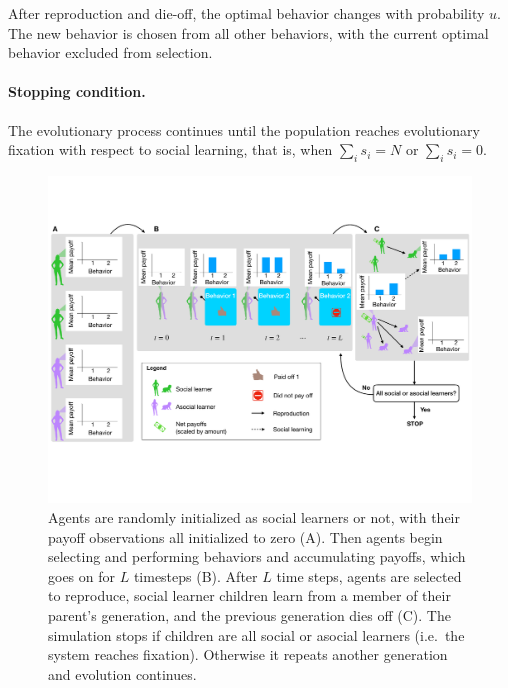 \documentclass[letterpaper,11.5pt]{scrartcl}
\newcommand{\cm}[1]{{\textcolor{mypurple} {({\tiny CM:} #1)}}}
\begin{document}
After reproduction and die-off, the optimal behavior changes with probability
$u$. The new behavior is chosen from all other behaviors, with the 
current optimal behavior excluded from selection.

\paragraph{Stopping condition.} The evolutionary process continues until the
population reaches evolutionary fixation with respect to social learning, that is, when
$\sum_i s_i = N$ or $\sum_i s_i = 0$. 

\clearpage

\begin{figure}
  \caption{Agents are randomly initialized as social learners or not, with their
  payoff observations all initialized to zero (A). Then agents begin selecting
and performing behaviors and accumulating payoffs, which goes on for $L$
timesteps (B). After $L$ time steps, agents are selected to reproduce,
social learner children learn from a member of their parent's generation, and
the previous generation dies off (C). The simulation stops if children are all
social or asocial learners (i.e.\ the system reaches fixation).
Otherwise it repeats another generation and evolution continues.} 
  \label{fig:schematic}
  \centering
    \includegraphics[width=1.05\textwidth]{Figures/IntraInterGenerationalDynamics.pdf}
\end{figure}
\end{document}
